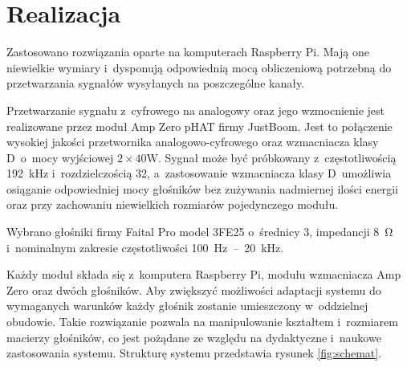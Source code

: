 \documentclass[10pt, a4paper]{article}
\let\Oldsection\section
\renewcommand{\section}{\FloatBarrier\Oldsection}
\begin{document}
\section{Realizacja}

Zastosowano rozwiązania oparte na komputerach Raspberry
Pi. Mają one niewielkie wymiary i~dysponują odpowiednią mocą obliczeniową
potrzebną do przetwarzania sygnałów wysyłanych na poszczególne kanały.

Przetwarzanie sygnału z~cyfrowego na analogowy oraz jego wzmocnienie jest
realizowane przez moduł Amp Zero pHAT firmy JustBoom. Jest to połączenie
wysokiej jakości przetwornika analogowo-cyfrowego oraz wzmacniacza klasy 
D~o~mocy wyjściowej $2\times40\si{\watt}$. Sygnał może być próbkowany 
z~częstotliwością \SI{192}{\kilo\hertz} i~rozdzielczością \SI{32}{\bit}, 
a~zastosowanie wzmacniacza klasy D~umożliwia osiąganie odpowiedniej mocy
głośników bez zużywania nadmiernej ilości energii oraz przy zachowaniu niewielkich
rozmiarów pojedynczego modułu.

Wybrano głośniki firmy Faital Pro model 3FE25
o~średnicy \SI{3}{\inch}, impedancji \SI{8}{\ohm} i~nominalnym zakresie 
częstotliwości \SI{100}{\hertz}~--~\SI{20}{\kilo\hertz}.


Każdy moduł składa się z~komputera Raspberry Pi, modułu wzmacniacza Amp Zero
oraz dwóch głośników.
Aby zwiększyć możliwości adaptacji systemu do wymaganych warunków
każdy głośnik zostanie umieszczony w~oddzielnej obudowie. Takie rozwiązanie
pozwala na manipulowanie kształtem i~rozmiarem macierzy głośników,
co jest pożądane ze względu na dydaktyczne i~naukowe zastosowania systemu.  
Strukturę systemu przedstawia rysunek \ref{fig:schemat}.
\end{document}

